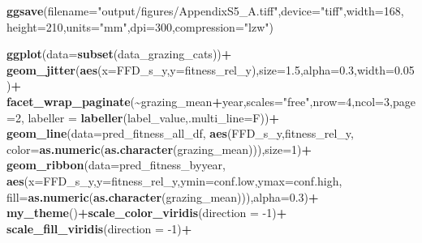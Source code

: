 \documentclass[
]{article}
\newenvironment{Shaded}{\begin{snugshade}}{\end{snugshade}}
\newcommand{\DataTypeTok}[1]{\textcolor[rgb]{0.13,0.29,0.53}{#1}}
\newcommand{\DecValTok}[1]{\textcolor[rgb]{0.00,0.00,0.81}{#1}}
\newcommand{\FloatTok}[1]{\textcolor[rgb]{0.00,0.00,0.81}{#1}}
\newcommand{\KeywordTok}[1]{\textcolor[rgb]{0.13,0.29,0.53}{\textbf{#1}}}
\newcommand{\NormalTok}[1]{#1}
\newcommand{\OperatorTok}[1]{\textcolor[rgb]{0.81,0.36,0.00}{\textbf{#1}}}
\newcommand{\StringTok}[1]{\textcolor[rgb]{0.31,0.60,0.02}{#1}}
\begin{document}
\begin{Shaded}
\begin{Highlighting}[]
\KeywordTok{ggsave}\NormalTok{(}\DataTypeTok{filename=}\StringTok{"output/figures/AppendixS5\_A.tiff"}\NormalTok{,}\DataTypeTok{device=}\StringTok{"tiff"}\NormalTok{,}\DataTypeTok{width=}\DecValTok{168}\NormalTok{,}
       \DataTypeTok{height=}\DecValTok{210}\NormalTok{,}\DataTypeTok{units=}\StringTok{"mm"}\NormalTok{,}\DataTypeTok{dpi=}\DecValTok{300}\NormalTok{,}\DataTypeTok{compression=}\StringTok{"lzw"}\NormalTok{)}

\KeywordTok{ggplot}\NormalTok{(}\DataTypeTok{data=}\KeywordTok{subset}\NormalTok{(data\_grazing\_cats))}\OperatorTok{+}
\StringTok{  }\KeywordTok{geom\_jitter}\NormalTok{(}\KeywordTok{aes}\NormalTok{(}\DataTypeTok{x=}\NormalTok{FFD\_s\_y,}\DataTypeTok{y=}\NormalTok{fitness\_rel\_y),}\DataTypeTok{size=}\FloatTok{1.5}\NormalTok{,}\DataTypeTok{alpha=}\FloatTok{0.3}\NormalTok{,}\DataTypeTok{width=}\FloatTok{0.05}\NormalTok{)}\OperatorTok{+}
\StringTok{  }\KeywordTok{facet\_wrap\_paginate}\NormalTok{(}\OperatorTok{\textasciitilde{}}\NormalTok{grazing\_mean}\OperatorTok{+}\NormalTok{year,}\DataTypeTok{scales=}\StringTok{"free"}\NormalTok{,}\DataTypeTok{nrow=}\DecValTok{4}\NormalTok{,}\DataTypeTok{ncol=}\DecValTok{3}\NormalTok{,}\DataTypeTok{page=}\DecValTok{2}\NormalTok{,}
                      \DataTypeTok{labeller =} \KeywordTok{labeller}\NormalTok{(label\_value,}\DataTypeTok{.multi\_line=}\NormalTok{F))}\OperatorTok{+}
\StringTok{  }\KeywordTok{geom\_line}\NormalTok{(}\DataTypeTok{data=}\NormalTok{pred\_fitness\_all\_df,}
            \KeywordTok{aes}\NormalTok{(FFD\_s\_y,fitness\_rel\_y,}
                \DataTypeTok{color=}\KeywordTok{as.numeric}\NormalTok{(}\KeywordTok{as.character}\NormalTok{(grazing\_mean))),}\DataTypeTok{size=}\DecValTok{1}\NormalTok{)}\OperatorTok{+}
\StringTok{  }\KeywordTok{geom\_ribbon}\NormalTok{(}\DataTypeTok{data=}\NormalTok{pred\_fitness\_byyear,}
              \KeywordTok{aes}\NormalTok{(}\DataTypeTok{x=}\NormalTok{FFD\_s\_y,}\DataTypeTok{y=}\NormalTok{fitness\_rel\_y,}\DataTypeTok{ymin=}\NormalTok{conf.low,}\DataTypeTok{ymax=}\NormalTok{conf.high,}
                  \DataTypeTok{fill=}\KeywordTok{as.numeric}\NormalTok{(}\KeywordTok{as.character}\NormalTok{(grazing\_mean))),}\DataTypeTok{alpha=}\FloatTok{0.3}\NormalTok{)}\OperatorTok{+}
\StringTok{  }\KeywordTok{my\_theme}\NormalTok{()}\OperatorTok{+}\KeywordTok{scale\_color\_viridis}\NormalTok{(}\DataTypeTok{direction =} \DecValTok{{-}1}\NormalTok{)}\OperatorTok{+}
\StringTok{  }\KeywordTok{scale\_fill\_viridis}\NormalTok{(}\DataTypeTok{direction =} \DecValTok{{-}1}\NormalTok{)}\OperatorTok{+}

\end{Highlighting}
\end{Shaded}
\end{document}
